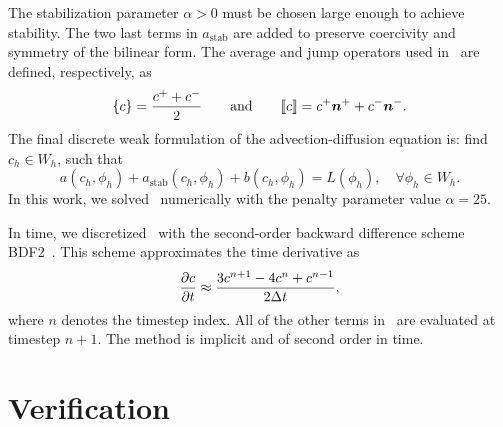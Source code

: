 \documentclass{WileyMSP-template}
\begin{document}
The stabilization parameter $\alpha>0$ must be chosen
large enough to achieve stability. The two last terms in $a_{\mathrm{stab}}$ are
added to preserve coercivity and symmetry of the bilinear form. The average and jump operators used
in~ are defined, respectively, as
\begin{equation*}
    \{c\} = \frac{c^+ + c^-}{2} \qquad\mathrm{and}\qquad \llbracket c\rrbracket = c^+\bm{n}^+ + c^-\bm{n}^-.
\end{equation*}
The final discrete weak formulation of the advection-diffusion equation is:
find $c_h\in W_h$, such that
\begin{equation}
    a(c_h, \phi_h) + a_{\mathrm{stab}}(c_h, \phi_h) + b(c_h, \phi_h) = L(\phi_h),
    \quad\forall\phi_h\in W_h.
    \label{eq:discrete_weak_form_adv_diff}
\end{equation}
In this work, we solved~ numerically
with the penalty parameter value $\alpha=25$.

In time, we discretized~ with the
second-order backward difference scheme BDF2~\cite{Volker2016}. This scheme
approximates the time derivative as
\begin{equation*}
    \frac{\partial c}{\partial t} \approx \frac{3c^{n+1} - 4c^n + c^{n-1}}{2\Delta t},
\end{equation*}
where $n$ denotes the timestep index. All of the other terms
in~ are evaluated at timestep $n+1$.
The method is implicit and of second order in time.

\section{Verification}\label{sec:appB_verification}
\end{document}
